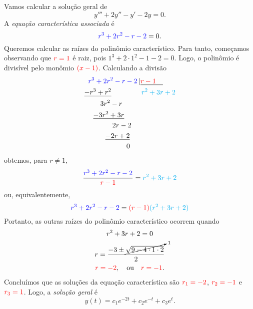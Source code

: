 \begin{ex}\label{ex:edolin_on_h}
  Vamos calcular a solução geral de
  \begin{equation}
    y''' + 2y'' - y' - 2y = 0.
  \end{equation}
  A \emph{equação característica associada} é
  \begin{equation}
    {\color{blue}r^3 + 2r^2 - r - 2} = 0.
  \end{equation}
  Queremos calcular as raízes do polinômio característico. Para tanto, começamos observando que ${\color{red}r=1}$ é raiz, pois $1^3+2\cdot 1^2 - 1 - 2 = 0$. Logo, o polinômio é divisível pelo monômio ${\color{red}(x-1)}$. Calculando a divisão
  \begin{align}
    &\;\;{\color{blue}r^3 + 2r^2 - r - 2} \,|\underline{{\color{red}r-1}\quad}\\
    &\underline{-r^3 + r^2}\quad\quad\quad\quad\;{\color{cyan}r^2+3r+2}\\
    &\quad\quad\; 3r^2 - r\\
    &\quad\; \underline{-3r^2 + 3r}\\
    &\quad\quad\quad\quad 2r - 2\\
    &\quad\quad\quad\underline{-2r + 2}\\
    &\quad\quad\quad\quad\quad\quad 0
  \end{align}
  obtemos, para $r\neq 1$,
  \begin{equation}
    \frac{{\color{blue}r^3 + 2r^2 - r - 2}}{{\color{red}r-1}} = {\color{cyan}r^2+3r+2}
  \end{equation}
  ou, equivalentemente,
  \begin{equation}
    {\color{blue}r^3 + 2r^2 - r - 2} = {\color{red}(r-1)}{\color{cyan}(r^2+3r+2)}
  \end{equation}
  Portanto, as outras raízes do polinômio característico ocorrem quando
  \begin{gather}
    r^2 + 3r + 2 = 0\\
    r = \frac{-3 \pm \cancelto{1}{\sqrt{9-4\cdot 1\cdot 2}}}{2}\\
    {\color{red}r = -2},\quad\text{ou}\quad {\color{red}r = -1}.
  \end{gather}
  Concluímos que as soluções da equação característica são ${\color{red}r_1 = -2}$, ${\color{red}r_2 = -1}$ e ${\color{red}r_3=1}$. Logo, a \emph{solução geral} é
  \begin{equation}
    y(t) = c_1e^{-2t} + c_2e^{-t} + c_3e^t.
  \end{equation}


\end{ex}
